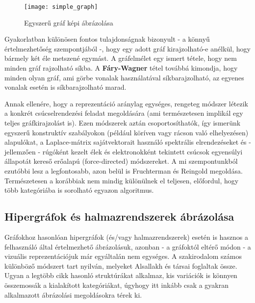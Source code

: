 \begin{figure}[H]
	\centering
	\texttt{[image: simple\_graph]}
	\caption{Egyszerű gráf képi ábrázolása}
\end{figure}

Gyakorlatban különösen fontos tulajdonságnak bizonyult - a könnyű értelmezhetőség szempontjából -, hogy egy adott gráf kirajzolható-e anélkül, hogy bármely két éle metszené egymást. A gráfelmélet egy ismert tétele, hogy nem minden gráf rajzolható síkba. A \textbf{Fáry-Wagner} tétel továbbá kimondja, hogy minden olyan gráf, ami görbe vonalak használatával síkbarajzolható, az egyenes vonalak esetén is síkbarajzolható marad.

Annak ellenére, hogy a reprezentáció aránylag egységes, rengeteg módszer létezik a konkrét csúcselrendezési feladat megoldására (ami természetesen implikál egy teljes gráfkirajzolást is). Ezen módszerek aztán csoportosíthatók, így ismerünk egyszerű konstruktív szabályokon (például köríven vagy rácson való elhelyezésen) alapulókat\cite{graph_layout_circular, graph_layout_circular2, graph_layout_orthogonal}, a Laplace-mátrix sajátvektorait használó spektrális elrendezéseket\cite{graph_layout_spectral} és - jellemzően - rúgóként kezelt élek és elektronokként tekintett csúcsok egyensúlyi állapotát kereső erőalapú (force-directed) módszereket\cite{graph_layout_force_directed, graph_layout_force_directed2}. A mi szempontunkból ezutóbbi lesz a legfontosabb, azon belül is Fruchterman és Reingold megoldása\cite{graph_layout_fruchterman}. Természetesen a korábbiak nem mindig különülnek el teljesen, előfordul, hogy több kategóriába is sorolható egyazon algoritmus\cite{graph_layout_hybrid}.

\subsection{Hipergráfok és halmazrendszerek ábrázolása}

Gráfokhoz hasonlóan hipergráfok (és/vagy halmazrendszerek) esetén is hasznos a felhasználó által értelmezhető ábrázolásuk, azonban - a gráfoktól eltérő módon - a vizuális reprezentációjuk már egyáltalán nem egységes. A szakirodalom számos különböző módszert tart nyilván, melyeket Alsallakh és társai foglaltak össze\cite{alsallakah2016_the_state_of_the_art_set_visualization}. Ugyan a legtöbb cikk hasonló struktúrákat alkalmaz, kis variációk is könnyen összemossák a kialakított kategóriákat, úgyhogy itt inkább csak a gyakran alkalmazott ábrázolási megoldásokra térek ki.


